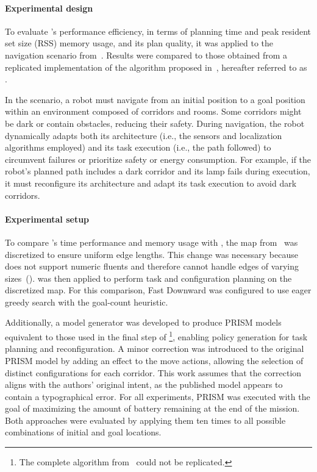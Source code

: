 \paragraph{Experimental design}
To evaluate \planta's performance efficiency, in terms of planning time and peak resident set size (RSS) memory usage, and its plan quality, it was applied to the navigation scenario from~\cite{CAMARASoftwareArchitectureTask2020}. Results were compared to those obtained from a replicated implementation of the algorithm proposed in~\cite{CAMARASoftwareArchitectureTask2020}, hereafter referred to as \CamaraApproach.

In the scenario, a robot must navigate from an initial position to a goal position within an environment composed of corridors and rooms. Some corridors might be dark or contain obstacles, reducing their safety. During navigation, the robot dynamically adapts both its architecture (i.e., the sensors and localization algorithms employed) and its task execution (i.e., the path followed) to circumvent failures or prioritize safety or energy consumption. For example, if the robot's planned path includes a dark corridor and its lamp fails during execution, it must reconfigure its architecture and adapt its task execution to avoid dark corridors.

\paragraph{Experimental setup}

To compare \planta's time performance and memory usage with \CamaraApproach, the map from~\cite{CAMARASoftwareArchitectureTask2020} was discretized to ensure uniform edge lengths. This change was necessary because \planta does not support numeric fluents and therefore cannot handle edges of varying sizes~().
\planta was then applied to perform task and configuration planning on the discretized map. For this comparison, Fast Downward was configured to use eager greedy search with the goal-count heuristic.

Additionally, a model generator was developed to produce PRISM models equivalent to those used in the final step of \CamaraApproach\footnote{The complete algorithm from~\cite{CAMARASoftwareArchitectureTask2020} could not be replicated.}, enabling policy generation for task planning and reconfiguration. A minor correction was introduced to the original PRISM model by adding an effect to the move actions, allowing the selection of distinct configurations for each corridor.  This work assumes that the correction aligns with the authors’ original intent, as the published model appears to contain a typographical error. For all experiments, PRISM was executed with the goal of maximizing the amount of battery remaining at the end of the mission. Both approaches were evaluated by applying them ten times to all possible combinations of initial and goal locations.

